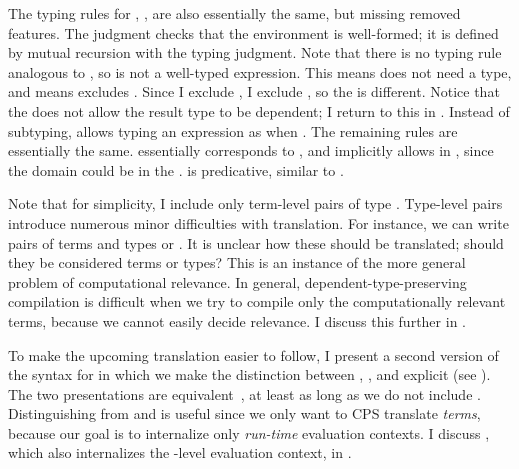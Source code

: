 \FigCoCTyping
The typing rules for \cpsslang, , are also
essentially the same, but missing removed features.
The judgment \im{\swf{\slenv}} checks that the environment
\im{\slenv} is well-formed; it is defined by mutual recursion with the
typing judgment.
Note that there is no typing rule analogous to , so
\im{\sboxty} is not a well-typed expression.
This means \im{\sboxty} does not need a type, and means \cpsslang excludes
.
Since I exclude , I exclude , so the
 is different.
Notice that the  does not allow the result type to be dependent; I
return to this in .
Instead of subtyping,  allows typing an expression
\im{\se : \sA} as \im{\se : \sB} when \im{\sA \equiv \sB}.
The remaining rules are essentially the same.
 essentially corresponds to , and
implicitly allows  in \im{\sstarty}, since the domain
\im{\sA} could be in the  \im{\sboxty}.
 is predicative, similar to
.

Note that for simplicity, I include only term-level pairs of type
\im{\ssigmaty{\sx}{\sA}{\sB} : \sstarty}.
Type-level pairs \im{\ssigmaty{\sx}{\sA}{\sB} : \sboxty} introduce
numerous minor difficulties with  translation.
For instance, we can write pairs of terms and types \im{\spaire{\se}{\sA}} or
\im{\spaire{\sA}{\se}}.
It is unclear how these  should be  translated;
should they be considered terms or types?
This is an instance of the more general problem of computational relevance.
In general, dependent-type-preserving compilation is difficult when we try to
compile only the computationally relevant terms, because we cannot easily decide
relevance.
I discuss this further in .

\FigECCExplicitSyntax
To make the upcoming  translation easier to follow, I present a second
version of the syntax for \cpsslang in which we make the distinction between
, , and  explicit (see
).
The two presentations are equivalent~\cite{barthe1999}, at least as long as we
do not include  .
Distinguishing  from  and  is useful since
we only want to CPS translate \emph{terms}, because our goal is to internalize
only \emph{run-time} evaluation contexts.
I discuss , which also internalizes the
-level evaluation context, in .
